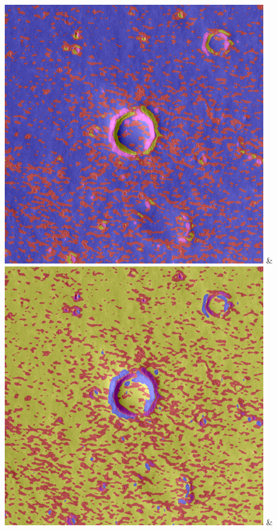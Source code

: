 \begin{table}[h!]
\begin{tabularx}{\textwidth}
		\includegraphics[width=0.9\linewidth]{images/gen/color_weight/p03_01.png_0.33.png} &
		\includegraphics[width=0.9\linewidth]{images/gen/color_weight/p03_01.png_0.66.png} &

\end{tabularx}
\end{table}
